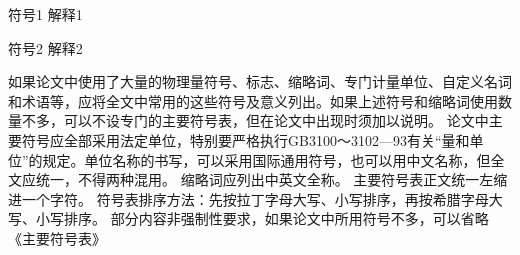 % 
%
%
% 
%
\begin{denotation}
        \item[符号1]    解释1
        \item[符号2]    解释2
\end{denotation}
如果论文中使用了大量的物理量符号、标志、缩略词、专门计量单位、自定义名词和术语等，应将全文中常用的这些符号及意义列出。如果上述符号和缩略词使用数量不多，可以不设专门的主要符号表，但在论文中出现时须加以说明。
论文中主要符号应全部采用法定单位，特别要严格执行GB3100～3102—93有关“量和单位”的规定。单位名称的书写，可以采用国际通用符号，也可以用中文名称，但全文应统一，不得两种混用。
缩略词应列出中英文全称。
主要符号表正文统一左缩进一个字符。
符号表排序方法：先按拉丁字母大写、小写排序，再按希腊字母大写、小写排序。
部分内容非强制性要求，如果论文中所用符号不多，可以省略《主要符号表》